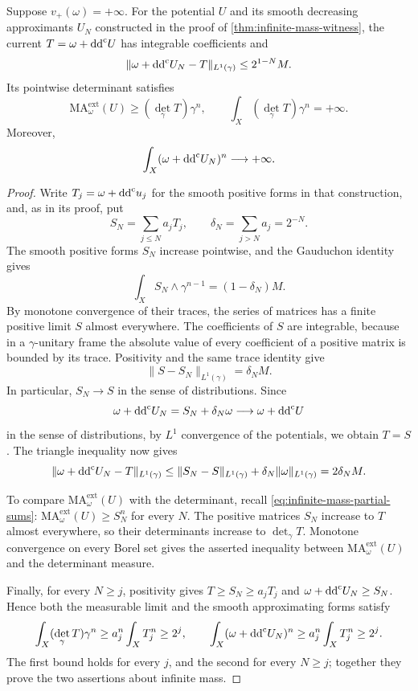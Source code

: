 \begin{proposition}\label{prop:integrable-infinite-mass}
Suppose $v_+(\omega)=+\infty$. For the potential $U$ and its smooth decreasing approximants $U_N$ constructed in the proof of \cref{thm:infinite-mass-witness}, the current $T=\omega+\mathrm{dd}^{\mathrm{c}} U$ has integrable coefficients and
\[
 \|\omega+\mathrm{dd}^{\mathrm{c}} U_N-T\|_{L^1(\gamma)}
 \leq2^{1-N}M.
\]
Its pointwise determinant satisfies
\[
 \mathrm{MA}^{\mathrm{ext}}_\omega(U)
 \geq (\det_\gamma T)\gamma^n,
 \qquad
 \int_X(\det_\gamma T)\gamma^n=+\infty.
\]
Moreover,
\[
 \int_X(\omega+\mathrm{dd}^{\mathrm{c}} U_N)^n\longrightarrow+\infty.
\]
\end{proposition}
\begin{proof}
Write $T_j=\omega+\mathrm{dd}^{\mathrm{c}} u_j$ for the smooth positive forms in that construction, and, as in its proof, put
\[
 S_N=\sum_{j\leq N}a_jT_j,\qquad
 \delta_N=\sum_{j>N}a_j=2^{-N}.
\]
The smooth positive forms $S_N$ increase pointwise, and the Gauduchon identity gives
\[
 \int_XS_N\wedge\gamma^{n-1}=(1-\delta_N)M.
\]
By monotone convergence of their traces, the series of matrices has a finite positive limit $S$ almost everywhere. The coefficients of $S$ are integrable, because in a $\gamma$-unitary frame the absolute value of every coefficient of a positive matrix is bounded by its trace. Positivity and the same trace identity give
\[
 \|S-S_N\|_{L^1(\gamma)}=\delta_N M.
\]
In particular, $S_N\to S$ in the sense of distributions. Since
\[
 \omega+\mathrm{dd}^{\mathrm{c}} U_N=S_N+\delta_N\omega
 \longrightarrow\omega+\mathrm{dd}^{\mathrm{c}} U
\]
in the sense of distributions, by $L^1$ convergence of the potentials, we obtain $T=S$. The triangle inequality now gives
\[
 \|\omega+\mathrm{dd}^{\mathrm{c}} U_N-T\|_{L^1(\gamma)}
 \leq\|S_N-S\|_{L^1(\gamma)}
       +\delta_N\|\omega\|_{L^1(\gamma)}
 =2\delta_N M.
\]

To compare $\mathrm{MA}^{\mathrm{ext}}_\omega(U)$ with the determinant, recall \eqref{eq:infinite-mass-partial-sums}: $\mathrm{MA}^{\mathrm{ext}}_\omega(U)\geq S_N^n$ for every $N$. The positive matrices $S_N$ increase to $T$ almost everywhere, so their determinants increase to $\det_\gamma T$. Monotone convergence on every Borel set gives the asserted inequality between $\mathrm{MA}^{\mathrm{ext}}_\omega(U)$ and the determinant measure.

Finally, for every $N\geq j$, positivity gives $T\geq S_N\geq a_jT_j$ and $\omega+\mathrm{dd}^{\mathrm{c}} U_N\geq S_N$. Hence both the measurable limit and the smooth approximating forms satisfy
\[
 \int_X(\det_\gamma T)\gamma^n
 \geq a_j^n\int_XT_j^n\geq2^j,
 \qquad
 \int_X(\omega+\mathrm{dd}^{\mathrm{c}} U_N)^n
 \geq a_j^n\int_XT_j^n\geq2^j.
\]
The first bound holds for every $j$, and the second for every $N\geq j$; together they prove the two assertions about infinite mass.
\end{proof}

